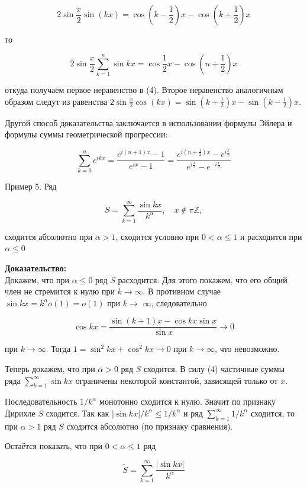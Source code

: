 \documentclass[a4paper,12pt]{article} %
\begin{document}
	$$
	2 \sin \frac{x}{2} \sin (k x)=\cos \left(k-\frac{1}{2}\right) x-\cos \left(k+\frac{1}{2}\right) x
	$$
	
	то
	
	$$
	2 \sin \frac{x}{2} \sum_{k=1}^{n} \sin k x=\cos \frac{1}{2} x-\cos \left(n+\frac{1}{2}\right) x
	$$
	
	откуда получаем первое неравенство в (4). Второе неравенство аналогичным образом следут из равенства $2 \sin \frac{x}{2} \cos (k x)=\sin \left(k+\frac{1}{2}\right) x-\sin \left(k-\frac{1}{2}\right) x$.
	
	Другой способ доказательства заключается в использовании формулы Эйлера и формулы суммы геометрической прогрессии:
	
	$$
	\sum_{k=0}^{n} e^{i k x}=\frac{e^{i(n+1) x}-1}{e^{i x}-1}=\frac{e^{i\left(n+\frac{1}{2}\right) x}-e^{i \frac{x}{2}}}{e^{i \frac{x}{2}}-e^{-i \frac{x}{2}}}
	$$
	
	Пример 5. Ряд
	
	$$
	S=\sum_{k=1}^{\infty} \frac{\sin k x}{k^{\alpha}}, \quad x \notin \pi \mathbb{Z},
	$$
	
	сходится абсолютно при $\alpha>1$, сходится условно при $0<\alpha \leq 1$ и расходится при $\alpha \leq 0$
	
	\textbf{Доказательство:\\}
	Докажем, что при $\alpha \leq 0$ ряд $S$ расходится. Для этого покажем, что его общий член не стремится к нулю при $k \rightarrow \infty$. В противном случае $\sin k x=k^{\alpha} o(1)=o(1)$ при $k \rightarrow$ $\infty$, следовательно
	
	$$
	\cos k x=\frac{\sin (k+1) x-\cos k x \sin x}{\sin x} \rightarrow 0
	$$
	
	при $k \rightarrow \infty$. Тогда $1=\sin ^{2} k x+\cos ^{2} k x \rightarrow 0$ при $k \rightarrow \infty$, что невозможно.
	
	Теперь докажем, что при $\alpha>0$ ряд $S$ сходится. В силу (4) частичные суммы ряда $\sum_{k=1}^{\infty} \sin k x$ ограничены некоторой константой, зависящей только от $x$.
	
	Последовательность $1 / k^{\alpha}$ монотонно сходится к нулю. Значит по признаку Дирихле $S$ сходится. Так как $|\sin k x| / k^{\alpha} \leq 1 / k^{\alpha}$ и ряд $\sum_{k=1}^{\infty} 1 / k^{\alpha}$ сходится, то при $\alpha>1$ ряд $S$ сходится абсолютно (по признаку сравнения).
	
	Остаётся показать, что при $0<\alpha \leq 1$ ряд
	
	$$
	\tilde{S}=\sum_{k=1}^{\infty} \frac{|\sin k x|}{k^{\alpha}}
	$$
	
\end{document}
